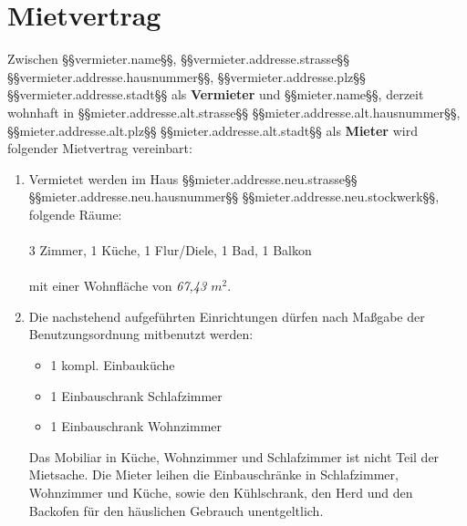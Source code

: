 \documentclass{scrreprt}[12pt,a4paper,twoside,duplex]
\begin{document}
\chapter*{Mietvertrag}

Zwischen §§vermieter.name§§, §§vermieter.addresse.strasse§§ §§vermieter.addresse.hausnummer§§, §§vermieter.addresse.plz§§ §§vermieter.addresse.stadt§§ als \textbf{Vermieter} und
\mbox{§§mieter.name§§}, derzeit wohnhaft in §§mieter.addresse.alt.strasse§§ §§mieter.addresse.alt.hausnummer§§, §§mieter.addresse.alt.plz§§ §§mieter.addresse.alt.stadt§§ als
\textbf{Mieter} wird folgender Mietvertrag vereinbart:

\begin{contract}
\label{mietsache:Raeume}

\begin{enumerate}
  \item Vermietet werden im Haus §§mieter.addresse.neu.strasse§§ §§mieter.addresse.neu.hausnummer§§ §§mieter.addresse.neu.stockwerk§§, folgende Räume:
\\\\
\textcolor{zuBearbeiten}{3 Zimmer, 1 Küche, 1 Flur/Diele, 1 Bad, 1 Balkon
\\\\
mit einer Wohnfläche von \textsl{67,43 $m^2$}}.
\item Die nachstehend aufgeführten Einrichtungen dürfen nach Maßgabe der
Benutzungsordnung mitbenutzt werden:

\begin{itemize}
  \color{zuBearbeiten}
  \item 1 kompl. Einbauküche
  \item 1 Einbauschrank Schlafzimmer
  \item 1 Einbauschrank Wohnzimmer
\end{itemize}
Das Mobiliar in Küche, Wohnzimmer und Schlafzimmer ist nicht Teil der Mietsache. Die Mieter leihen die Einbauschränke in Schlafzimmer, Wohnzimmer und Küche, sowie den Kühlschrank, den Herd und den Backofen für den häuslichen Gebrauch unentgeltlich.


\end{enumerate}
\end{contract}
\end{document}

